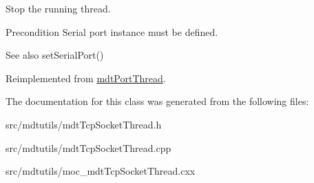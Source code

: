Stop the running thread. 

\begin{DoxyPrecond}{Precondition}
Serial port instance must be defined. 
\end{DoxyPrecond}
\begin{DoxySeeAlso}{See also}
setSerialPort() 
\end{DoxySeeAlso}


Reimplemented from \hyperlink{classmdt_port_thread_a5746ea96689ed80179751ad1353f0b39}{mdtPortThread}.



The documentation for this class was generated from the following files:\begin{DoxyCompactItemize}
\item 
src/mdtutils/mdtTcpSocketThread.h\item 
src/mdtutils/mdtTcpSocketThread.cpp\item 
src/mdtutils/moc\_\-mdtTcpSocketThread.cxx\end{DoxyCompactItemize}
